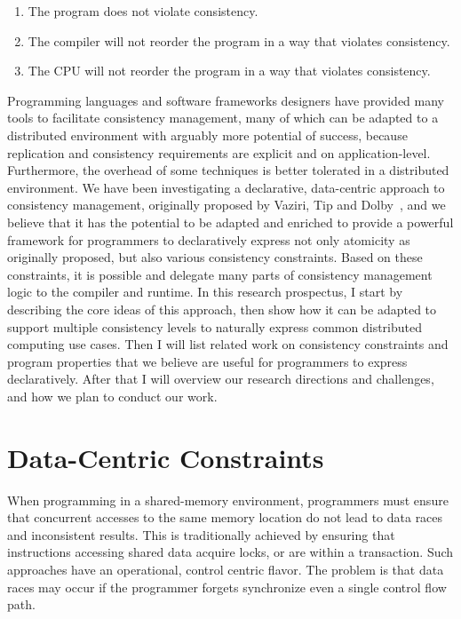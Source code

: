 \documentclass[]{usiinfprospectus}
\begin{document}
\begin{enumerate}
	\item The program does not violate consistency.
	\item The compiler will not reorder the program in a way that violates consistency.
	\item The CPU will not reorder the program in a way that violates consistency.
\end{enumerate}


Programming languages and software frameworks designers have provided many tools to facilitate consistency management, many of which can be adapted to a distributed environment with arguably more potential of success, because replication and consistency requirements are explicit and on application-level. Furthermore, the overhead of some techniques is better tolerated in a distributed environment. We have been investigating a declarative, data-centric approach to consistency management, originally proposed by Vaziri, Tip and Dolby~\cite{Vaziri:2006:ASC:1111320.1111067}, and we believe that it has the potential to be adapted and enriched to provide a powerful framework for programmers to declaratively express not only atomicity as originally proposed, but also various consistency constraints. Based on these constraints, it is possible and delegate many parts of consistency management logic to the compiler and runtime. In this research prospectus, I start by describing the core ideas of this approach, then show how it can be adapted to support multiple consistency levels to naturally express common distributed computing use cases. Then I will list related work on consistency constraints and program properties that we believe are useful for programmers to express  declaratively. After that I will overview our research directions and challenges, and how we plan to conduct our work.

\section{Data-Centric Constraints}

When programming in a shared-memory environment, programmers must ensure that concurrent accesses to the same memory location do not lead to data races and inconsistent results. This is traditionally achieved by ensuring that instructions accessing shared data acquire locks, or are within a transaction. Such approaches have an operational, control centric flavor. The problem is that data races may occur if the programmer forgets synchronize even a single control flow path.
\end{document}
